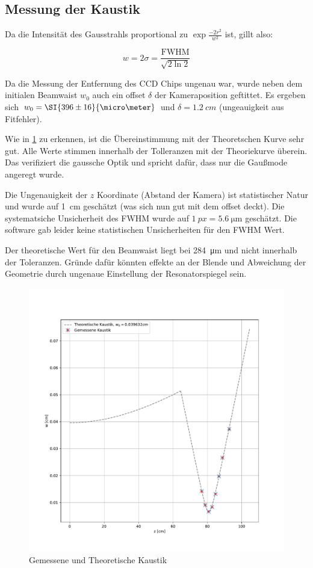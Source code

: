 \documentclass[slug=GL, room=HZDR\ Dresden/Rossendorf\,\ Geb.\ 620/123, supervisor=Tim\ Ziegler]{../../Lab_Report_LaTeX/lab_report}
\begin{document}
\subsection{Messung der Kaustik}
\label{sec:messkaustdisk}
Da die Intensit\"at des Gausstrahls proportional zu
\(\exp{\frac{-2r^2}{w^2}}\) ist, gillt also:

\begin{equation}
  \label{eq:beamwaistfwhm}
  w = 2\sigma = \frac{\text{FWHM}}{\sqrt{2\ln{2}}}
\end{equation}

Da die Messung der Entfernung des CCD Chips ungenau war, wurde neben
dem initialen Beamwaist \(w_0\) auch ein offset \(\delta\) der Kameraposition
geftittet. Es ergeben sich \(w_0=\SI{396\pm 16}{\micro\meter}\) und
\(\delta=\SI{1.2}{cm}\) (ungeauigkeit aus Fitfehler).

Wie in \ref{fig:kaustik} zu erkennen, ist die \"Ubereinstimmung mit
der Theoretschen Kurve sehr gut. Alle Werte stimmen innerhalb der
Tolleranzen mit der Theoriekurve \"uberein. Das verifiziert die
gaussche Optik und spricht daf\"ur, dass nur die Gau\ss{}mode angeregt
wurde.

Die Ungenauigkeit der \(z\) Koordinate (Abstand der Kamera) ist
statistischer Natur und wurde auf \SI{1}{\centi\meter} gesch\"atzt
(was sich nun gut mit dem offset deckt). Die systematsiche
Unsicherheit des FWHM wurde auf \(\SI{1}{px}=\SI{5.6}{\micro\meter}\)
gesch\"atzt. Die software gab leider keine statistischen
Unsicherheiten f\"ur den FWHM Wert.

Der theoretische Wert f\"ur den Beamwaist liegt bei
\SI{284}{\micro\meter} und nicht innerhalb der Toleranzen. Gr\"unde
daf\"ur k\"onnten effekte an der Blende und Abweichung der Geometrie
durch ungenaue Einstellung der Resonatorspiegel sein.

\begin{figure}[b]\centering
  \includegraphics[width=.8\columnwidth]{figs/kaustik.pdf}
  \caption{Gemessene und Theoretische Kaustik}
  \label{fig:kaustik}
\end{figure}
\end{document}
